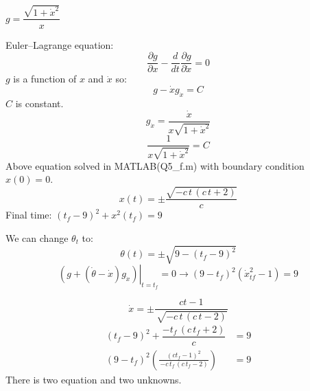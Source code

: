 $g = \dfrac{\sqrt{1+\dot x^2}}{x}$


Euler–Lagrange equation:
$$\dfrac{\partial g}{\partial x} - \dfrac{d}{dt}\dfrac{\partial g}{\partial \dot x} = 0$$
$g$ is a function of $x$ and $\dot x$ so:
$$g - \dot{x}g_{\dot x} = C$$
$C$ is constant.
$$g_{\dot{x}} = \dfrac{\dot x}{x\sqrt{1+\dot x^2}}$$
$$\dfrac{1}{x\sqrt{1+\dot x^2}}=C$$
Above equation solved in MATLAB(Q5\_f.m) with boundary condition $x(0) = 0$.
$$x(t) = \pm \dfrac{\sqrt{-c\,t\,{\left(c\,t+2\right)}}}{c}$$
Final time: 
$(t_f - 9)^2 + x^2(t_f) = 9$


We can change $\theta_{t}$ to:
$$\theta(t) = \pm \sqrt{9 - (t_f-9)^2}$$
$$\left.(g + (\dot{\theta}-\dot{x})g_{\dot{x}})\right\vert_{t = t_f}  = 0 \to (9-t_f)^2(\dot x_{tf}^2-1) = 9$$

$$\dot x =\pm \frac{ct-1}{\,
	\sqrt{-c\,t\,{\left(c\,t-2\right)}}}$$
\begin{align*}
	(t_f - 9)^2 + \dfrac{{-t_f\,{\left(c\,t_f+2\right)}}}{c} &= 9\\	
	(9-t_f)^2(\frac{(ct_f-1)^2}{\,
		{-c\,t_f\,{\left(c\,t_f-2\right)}}}) & = 9
\end{align*}
There is two equation and two unknowns.
